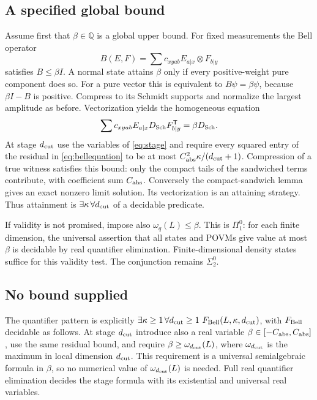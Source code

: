 \subsection{A specified global bound}
Assume first that $\beta\in\mathbb Q$ is a global upper bound. For fixed measurements the Bell operator
\[
 B(E,F)=\sum c_{xyab}E_{a|x}\otimes F_{b|y}
\]
satisfies $B\leq\beta I$. A normal state attains $\beta$ only if every positive-weight pure component does so. For a pure vector this is equivalent to $B\psi=\beta\psi$, because $\beta I-B$ is positive. Compress to its Schmidt supports and normalize the largest amplitude as before. Vectorization yields the homogeneous equation
\begin{equation}\label{eq:bellequation}
 \sum c_{xyab}E_{a|x}D_{\rm Sch}F_{b|y}^{\mathsf T}=\beta D_{\rm Sch}.
\end{equation}
At stage ${d_{\rm cut}}$ use the variables of \eqref{eq:stage} and require every squared entry of the residual in \eqref{eq:bellequation} to be at most $C_{\rm abs}^2\kappa/({d_{\rm cut}}+1)$. Compression of a true witness satisfies this bound: only the compact tails of the sandwiched terms contribute, with coefficient sum $C_{\rm abs}$. Conversely the compact-sandwich lemma gives an exact nonzero limit solution. Its vectorization is an attaining strategy. Thus attainment is $\exists \kappa\,\forall {d_{\rm cut}}$ of a decidable predicate.

If validity is not promised, impose also $\omega_q(L)\leq\beta$. This is $\Pi^0_1$: for each finite dimension, the universal assertion that all states and POVMs give value at most $\beta$ is decidable by real quantifier elimination. Finite-dimensional density states suffice for this validity test. The conjunction remains $\Sigma^0_2$.

\subsection{No bound supplied}
The quantifier pattern is explicitly $\exists \kappa\geq1\,\forall {d_{\rm cut}}\geq1\ F_{\rm Bell}(L,\kappa,{d_{\rm cut}})$, with $F_{\rm Bell}$ decidable as follows. At stage ${d_{\rm cut}}$ introduce also a real variable $\beta\in[-C_{\rm abs},C_{\rm abs}]$, use the same residual bound, and require $\beta\geq\omega_{d_{\rm cut}}(L)$, where $\omega_{d_{\rm cut}}$ is the maximum in local dimension ${d_{\rm cut}}$. This requirement is a universal semialgebraic formula in $\beta$, so no numerical value of $\omega_{d_{\rm cut}}(L)$ is needed. Full real quantifier elimination decides the stage formula with its existential and universal real variables.

